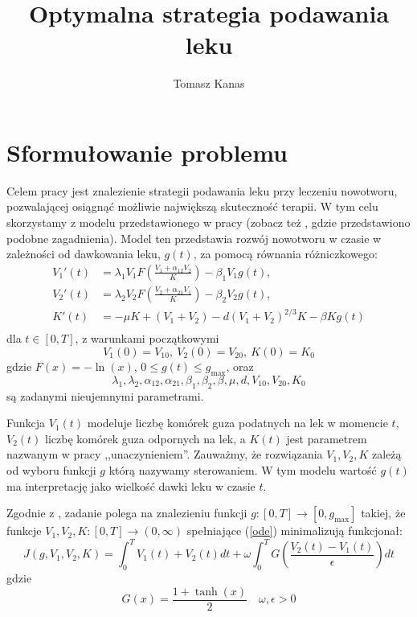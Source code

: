 \documentclass[11pt]{article}
\title{Optymalna strategia podawania leku}
\author{Tomasz Kanas}
\begin{document}
\maketitle

\section{Sformułowanie problemu}
Celem pracy jest znalezienie strategii podawania leku przy leczeniu nowotworu, pozwalającej osiągnąć możliwie największą skuteczność terapii. W tym celu skorzystamy z modelu przedstawionego w pracy \cite{BBF-manuscript} (zobacz też \cite{BBF2016}, \cite{BBF2019} gdzie przedstawiono podobne zagadnienia). Model ten przedstawia rozwój nowotworu w czasie w zależności od dawkowania leku, $g(t)$, za pomocą równania różniczkowego:
\begin{equation} \label{ode}
  \begin{aligned} 
    V_1'(t) &= \lambda_1V_1F\left(\frac{V_1 + \alpha_{12}V_2}{K}\right) - \beta_1V_1g(t), \\
    V_2'(t) &= \lambda_2V_2F\left(\frac{V_2 + \alpha_{21}V_1}{K}\right) - \beta_2V_2g(t), \\
    K'(t) &= -\mu K + (V_1+V_2) - d{(V_1 + V_2)}^{2/3}K - \beta K g(t) \\
  \end{aligned}
\end{equation}
dla $t \in [0, T]$, z warunkami początkowymi
\begin{equation} \label{ode-start}
   V_1(0) = V_{10},\ V_2(0) = V_{20},\ K(0) = K_0
\end{equation}
gdzie $F(x) = -\ln(x)$, $ 0 \le g(t) \le g_{\max}$, oraz
\[\lambda_1, \lambda_2, \alpha_{12}, \alpha_{21}, \beta_1, \beta_2, \beta, \mu, d, V_{10}, V_{20}, K_0 \]
są zadanymi nieujemnymi parametrami.

Funkcja $V_1(t)$ modeluje liczbę komórek guza podatnych na lek w momencie $t$, $V_2(t)$ liczbę komórek guza odpornych na lek, a $K(t)$ jest parametrem nazwanym w pracy ,,unaczynieniem''. Zauważmy, że rozwiązania $V_1, V_2, K$ zależą od wyboru funkcji $g$ którą nazywamy sterowaniem. W tym modelu wartość $g(t)$ ma interpretację jako wielkość dawki leku w czasie $t$.

Zgodnie z \cite{BBF-manuscript}, zadanie polega na znalezieniu funkcji $g: [0, T] \to [0, g_{\max}]$ takiej, że funkcje $V_1, V_2, K: [0, T] \to (0, \infty)$ spełniające (\ref{ode}) minimalizują funkcjonał:
\begin{equation} \label{objf}
  J(g, V_1, V_2, K) = \int_0^T V_1(t) + V_2(t)dt + \omega\int_0^T G\left(\frac{V_2(t) - V_1(t)}{\epsilon}\right) dt
\end{equation}
gdzie
\begin{equation*}
  G(x) = \frac{1+\tanh(x)}{2} \quad
  \omega, \epsilon > 0 
\end{equation*}
\end{document}
